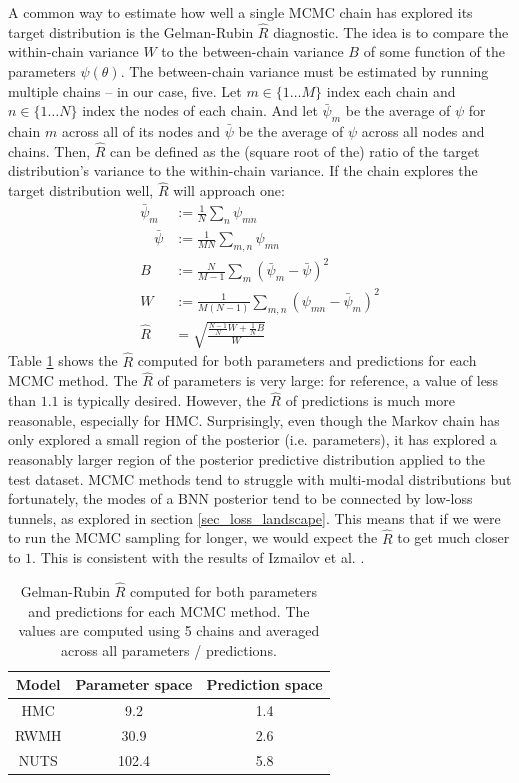 \documentclass[12pt]{article}
\begin{document}
A common way to estimate how well a single MCMC chain has explored its target distribution is the Gelman-Rubin $\hat{R}$ \cite{r_hat} diagnostic. The idea is to compare the within-chain variance $W$ to the between-chain variance $B$ of some function of the parameters $\psi (\theta)$. The between-chain variance must be estimated by running multiple chains -- in our case, five. Let $m \in \{1 \ldots M\}$ index each chain and $n \in \{1 \ldots N\}$ index the nodes of each chain. And let $\bar{\psi}_m$ be the average of $\psi$ for chain $m$ across all of its nodes and $\bar{\psi}$ be the average of $\psi$ across all nodes and chains. Then, $\hat{R}$ can be defined as the (square root of the) ratio of the target distribution's variance to the within-chain variance. If the chain explores the target distribution well, $\hat{R}$ will approach one:
\begin{align}
\bar{\psi}_m &:= \frac{1}{N} \sum_{n} \psi_{m n} \\
\quad \bar{\psi} &:= \frac{1}{M N} \sum_{m, n} \psi_{m n} \\
B &:= \frac{N}{M-1} \sum_{m} (\bar{\psi}_m-\bar{\psi})^2 \\
W &:= \frac{1}{M(N-1)} \sum_{m, n} (\psi_{m n}-\bar{\psi}_m)^{2} \\
\hat{R} &= \sqrt{\frac{\frac{N-1}{N} W+\frac{1}{N} B}{W}}
\end{align}
Table \ref{table_r_hat} shows the $\hat{R}$ computed for both parameters and predictions for each MCMC method. The $\hat{R}$ of parameters is very large: for reference, a value of less than $1.1$ is typically desired. However, the $\hat{R}$ of predictions is much more reasonable, especially for HMC. Surprisingly, even though the Markov chain has only explored a small region of the posterior (i.e. parameters), it has explored a reasonably larger region of the posterior predictive distribution applied to the test dataset. MCMC methods tend to struggle with multi-modal distributions but fortunately, the modes of a BNN posterior tend to be connected by low-loss tunnels, as explored in section \ref{sec_loss_landscape}. This means that if we were to run the MCMC sampling for longer, we would expect the $\hat{R}$ to get much closer to $1$. This is consistent with the results of Izmailov et al. \cite{bnn_posterior}.

\begin{table}[H]
\centering
\begin{tabular}{|c|c|c|}
\hline
Model & Parameter space & Prediction space \\ \hline
HMC   & 9.2             & 1.4              \\ \hline
RWMH  & 30.9            & 2.6              \\ \hline
NUTS  & 102.4           & 5.8              \\ \hline
\end{tabular}
\caption{Gelman-Rubin $\hat{R}$ computed for both parameters and predictions for each MCMC method. The values are computed using 5 chains and averaged across all parameters / predictions.}
\label{table_r_hat}
\end{table}
\end{document}
